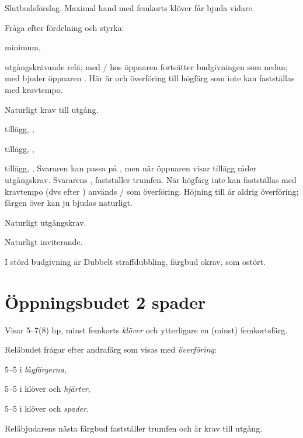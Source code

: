 \bbe
\item[--\pass, \spa{2},\kl{3}] Slutbudsförslag. Maximal hand med femkorts
  klöver får bjuda vidare. 
\item[--\NT{2}] Fråga efter fördelning och styrka:
\bbe
    \item[\kl{3}] minimum,
\bbe
\item[--\ru{3}] utgångskrävande relä; med  /
   hos öppnaren 
fort\-sät\-ter budgivningen som nedan; med  bjuder öppnaren
. Här 
är  och  överföring till högfärg som inte kan fastställas med
kravtempo. 
 \item[--annat] Naturligt krav till utgång.
\ebe
    \item[\ru{3}] tillägg, ,
    \item[\hj{3}] tillägg, ,
    \item[\spa{3}] tillägg, ,
\ebe
Svararen kan passa på , men när öppnaren visar tillägg råder utgångskrav.
Svararens ,  fastställer trumfen. När högfärg inte kan
fastställas med 
kravtempo (dvs efter ) används / som överföring. Höjning
till  
är aldrig överföring; färgen över kan ju bjudas naturligt.

\item[--\ru{3}] Naturligt utgångskrav.
\item[--\ho{3}, \kl{4}] Naturligt inviterande.
\ebe

I störd budgivning
är Dubbelt straffdubbling, färgbud okrav,  som ostört.

\section{\"Oppningsbudet 2 spader}

Visar 5--7(8) hp, minst femkorts \emph{klöver} och ytterligare en (minst)
femkortsfärg. 

\bbe
\item[--\NT{2}] Reläbudet frågar efter andrafärg som visas med
\emph{överföring}: 

\bbe
\item[\kl{3}] 5--5 i \emph{lågfärgerna},
\item[\ru{3}] 5--5 i klöver och \emph{hjärter},
\item[\hj{3}] 5--5 i klöver och \emph{spader}.
\ebe

Reläbjudarens nästa färgbud fastställer trumfen och är krav till utgång.

